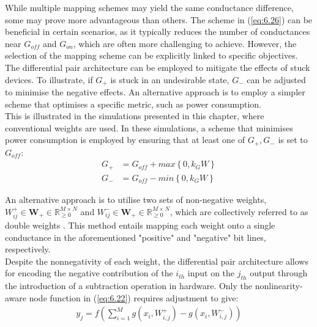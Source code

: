 \noindent While multiple mapping schemes may yield the same conductance difference, some may prove more advantageous than others. The scheme in (\ref{eq:6.26}) can be beneficial in certain scenarios, as it typically reduces the number of conductances near $G_{off}$ and $G_{on}$, which are often more challenging to achieve. However, the selection of the mapping scheme can be explicitly linked to specific objectives.\\

\noindent The differential pair architecture can be employed to mitigate the effects of stuck devices. To illustrate, if $G_+$ is stuck in an undesirable state, $G_-$ can be adjusted to minimise the negative effects. An alternative approach is to employ a simpler scheme that optimises a specific metric, such as power consumption. \\

\noindent This is illustrated in the simulations presented in this chapter, where conventional weights are used. In these simulations, a scheme that minimises power consumption is employed by ensuring that at least one of ${G_+, G_-}$ is set to $G_{off}$:
\begin{align}
G_+ &= G_{off} + max\left\{ 0, k_GW \right\} \label{eq:6.28} \\
G_- &= G_{off} - min\left\{ 0, k_GW \right\} \label{eq:6.29}
\end{align}

\noindent An alternative approach is to utilise two sets of non-negative weights, $W^+_{ij} \in \mathbf{W}_+ \in \mathbb{R}^{M \times N}_{\ge 0}$ and $W^-_{ij} \in \mathbf{W}_+ \in \mathbb{R}^{M \times N}_{\ge 0}$, which are collectively referred to as double weights \cite{kendall2020training}. This method entails mapping each weight onto a single conductance in the aforementioned "positive" and "negative" bit lines, respectively. \\

\noindent Despite the nonnegativity of each weight, the differential pair architecture allows for encoding the negative contribution of the $i_{th}$ input on the $j_{th}$ output through the introduction of a subtraction operation in hardware. Only the nonlinearity-aware node function in (\ref{eq:6.22}) requires adjustment to give:
\begin{align}
y_j = f\left( \sum_{i=1}^{M} g\left( x_i,W_{i,j}^+ \right) - g\left( x_i,W_{i,j}^- \right) \right) \label{eq:6.30}
\end{align}

